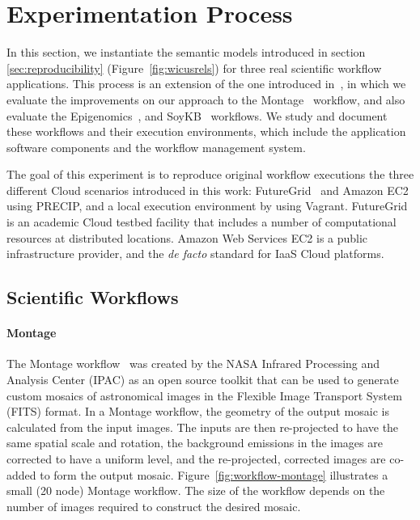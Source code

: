 \section{Experimentation Process}
\label{sec:experiment}


In this section, we instantiate the semantic models introduced in section \ref{sec:reproducibility}
(Figure~\ref{fig:wicusrels}) for three real scientific workflow applications. 
This process is an extension of the one introduced
 in~\cite{SantanaPerez-REPPAR-2014}, in which we evaluate the improvements on our
 approach to the Montage~\cite{Montage} workflow, and also evaluate the
 Epigenomics~\cite{genome}, and SoyKB~\cite{soybean, Joshi01012014} workflows.
We study and document these workflows and their execution environments, which include the application software components 
and the workflow management system.

The goal of this experiment is to reproduce original workflow executions  the three different 
Cloud scenarios introduced in this work: FutureGrid~\cite{futuregrid} and Amazon EC2~\cite{aws} 
using PRECIP, and a local execution environment by using Vagrant. 
FutureGrid is an academic Cloud testbed facility that includes a number of computational 
resources at distributed locations. Amazon Web Services EC2 is a public infrastructure 
provider, and the \emph{de facto} standard for IaaS Cloud platforms. 


\subsection{Scientific Workflows}

\paragraph{\textbf{Montage}}
The Montage workflow~\cite{Montage} was created by the NASA Infrared Processing 
and Analysis Center (IPAC) as an open source toolkit that can be used to generate 
custom mosaics of astronomical images in the Flexible Image Transport System (FITS) 
format. In a Montage workflow, the geometry of the output mosaic is calculated from the 
input images. The inputs are then re-projected to have the same spatial scale and rotation, 
the background emissions in the images are corrected to have a uniform level, and the 
re-projected, corrected images are co-added to form the output mosaic. 
Figure~\ref{fig:workflow-montage} illustrates a small (20 node) Montage workflow. The 
size of the workflow depends on the number of images required to construct the desired 
mosaic.

